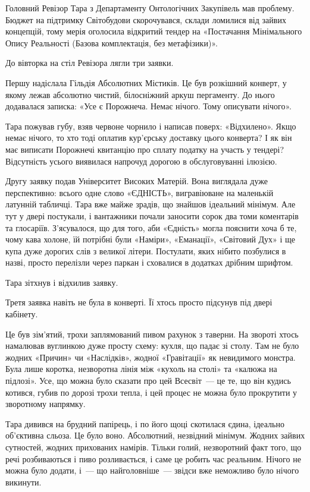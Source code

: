 \documentclass[12pt, a4paper, openany]{book}
\begin{document}
\begin{terrybox}
Головний Ревізор Тара з Департаменту Онтологічних Закупівель мав проблему. Бюджет на підтримку Світобудови скорочувався, склади ломилися від зайвих концепцій, тому мерія оголосила відкритий тендер на «Постачання Мінімального Опису Реальності (Базова комплектація, без метафізики)».

До вівторка на стіл Ревізора лягли три заявки.

Першу надіслала Гільдія Абсолютних Містиків. Це був розкішний конверт, у якому лежав абсолютно чистий, білосніжний аркуш пергаменту. До нього додавалася записка: «Усе є Порожнеча. Немає нічого. Тому описувати нічого».

Тара пожував губу, взяв червоне чорнило і написав поверх: «Відхилено». Якщо немає нічого, то хто тоді оплатив кур'єрську доставку цього конверта? І як він має виписати Порожнечі квитанцію про сплату податку на участь у тендері? Відсутність усього виявилася напрочуд дорогою в обслуговуванні ілюзією.

Другу заявку подав Університет Високих Матерій. Вона виглядала дуже перспективно: всього одне слово «ЄДНІСТЬ», вигравіюване на маленькій латунній табличці. Тара вже майже зрадів, що знайшов ідеальний мінімум. Але тут у двері постукали, і вантажники почали заносити сорок два томи коментарів та глосаріїв. З'ясувалося, що для того, аби «Єдність» могла пояснити хоча б те, чому кава холоне, їй потрібні були «Наміри», «Еманації», «Світовий Дух» і ще купа дуже дорогих слів з великої літери. Постулати, яких нібито позбулися в назві, просто перелізли через паркан і сховалися в додатках дрібним шрифтом.

Тара зітхнув і відхилив заявку.

Третя заявка навіть не була в конверті. Її хтось просто підсунув під двері кабінету.

Це був зім'ятий, трохи заплямований пивом рахунок з таверни. На звороті хтось намалював вуглинкою дуже просту схему: кухля, що падає зі столу. Там не було жодних «Причин» чи «Наслідків», жодної «Гравітації» як невидимого монстра. Була лише коротка, незворотна лінія між «кухоль на столі» та «калюжа на підлозі». Усе, що можна було сказати про цей Всесвіт~--- це те, що він кудись котився, губив по дорозі трохи тепла, і цей процес не можна було прокрутити у зворотному напрямку.

Тара дивився на брудний папірець, і по його щоці скотилася єдина, ідеально об'єктивна сльоза. Це було воно. Абсолютний, незвідний мінімум. Жодних зайвих сутностей, жодних прихованих намірів. Тільки голий, незворотний факт того, що речі розбиваються і пиво розливається, і саме це робить час реальним. Нічого не можна було додати, і~--- що найголовніше~--- звідси вже неможливо було нічого викинути.


\end{terrybox}
\end{document}
